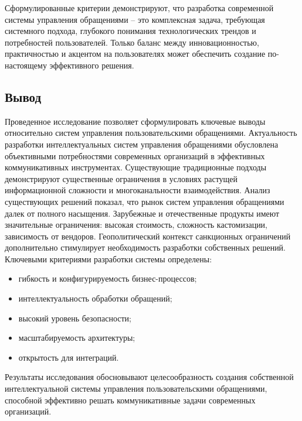 Сформулированные критерии демонстрируют, что разработка современной системы управления обращениями – это комплексная задача, требующая системного подхода, глубокого понимания технологических трендов и потребностей пользователей. Только баланс между инновационностью, практичностью и акцентом на пользователях может обеспечить создание по-настоящему эффективного решения.

\subsection{Вывод}

Проведенное исследование позволяет сформулировать ключевые выводы относительно систем управления пользовательскими обращениями.
Актуальность разработки интеллектуальных систем управления обращениями обусловлена объективными потребностями современных организаций в эффективных коммуникативных инструментах. Существующие традиционные подходы демонстрируют существенные ограничения в условиях растущей информационной сложности и многоканальности взаимодействия.
Анализ существующих решений показал, что рынок систем управления обращениями далек от полного насыщения. Зарубежные и отечественные продукты имеют значительные ограничения: высокая стоимость, сложность кастомизации, зависимость от вендоров. Геополитический контекст санкционных ограничений дополнительно стимулирует необходимость разработки собственных решений.
Ключевыми критериями разработки системы определены:

\begin{itemize}
    \item гибкость и конфигурируемость бизнес-процессов;
    \item интеллектуальность обработки обращений;
    \item высокий уровень безопасности;
    \item масштабируемость архитектуры;
    \item открытость для интеграций.
\end{itemize}

Результаты исследования обосновывают целесообразность создания собственной интеллектуальной системы управления пользовательскими обращениями, способной эффективно решать коммуникативные задачи современных организаций.